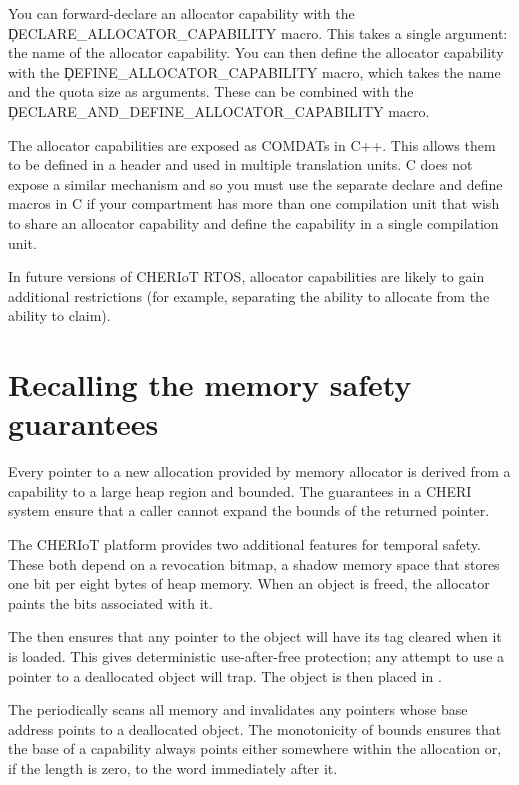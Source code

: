 You can forward-declare an allocator capability with the \c{DECLARE_ALLOCATOR_CAPABILITY} macro.
This takes a single argument: the name of the allocator capability.
You can then define the allocator capability with the \c{DEFINE_ALLOCATOR_CAPABILITY} macro, which takes the name and the quota size as arguments.
These can be combined with the \c{DECLARE_AND_DEFINE_ALLOCATOR_CAPABILITY} macro.

\begin{caution}
The allocator capabilities are exposed as COMDATs in C++.
This allows them to be defined in a header and used in multiple translation units.
C does not expose a similar mechanism and so you must use the separate declare and define macros in C if your compartment has more than one compilation unit that wish to share an allocator capability and define the capability in a single compilation unit.
\end{caution}

In future versions of CHERIoT RTOS, allocator capabilities are likely to gain additional restrictions (for example, separating the ability to allocate from the ability to claim).

\section{Recalling the memory safety guarantees}

Every pointer to a new allocation provided by memory allocator is derived from a capability to a large heap region and bounded.
The  guarantees in a CHERI system ensure that a caller cannot expand the bounds of the returned pointer.

The CHERIoT platform provides two additional features for temporal safety.
These both depend on a revocation bitmap, a shadow memory space that stores one bit per eight bytes of heap memory.
When an object is freed, the allocator paints the bits associated with it.

The  then ensures that any pointer to the object will have its tag cleared when it is loaded.
This gives deterministic use-after-free protection; any attempt to use a pointer to a deallocated object will trap.
The object is then placed in .

The  periodically scans all memory and invalidates any pointers whose base address points to a deallocated object.
The monotonicity of bounds ensures that the base of a capability always points either somewhere within the allocation or, if the length is zero, to the word immediately after it.

